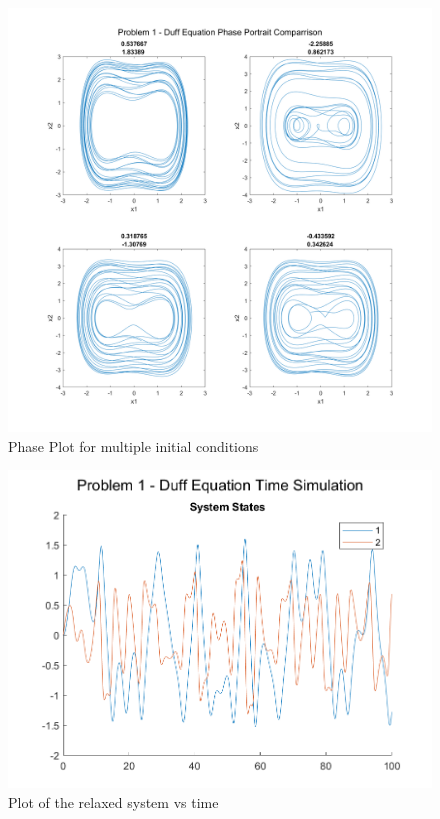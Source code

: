 \documentclass[letter]{article}
\begin{document}
\begin{figure}[p]
	\centering
	\includegraphics[width=1\linewidth]{fig/pblm1_phase_comparrision}
	\caption{Phase Plot for multiple initial conditions}
	\label{fig:pblm1phasecomparrision}
\end{figure}

\newpage
\begin{figure}[t]
	\centering
	\includegraphics[width=0.8\linewidth]{fig/pblm1_vs_time}
	\caption{Plot of the relaxed system vs time}
	\label{fig:pblm1vstime}
\end{figure}
\end{document}
